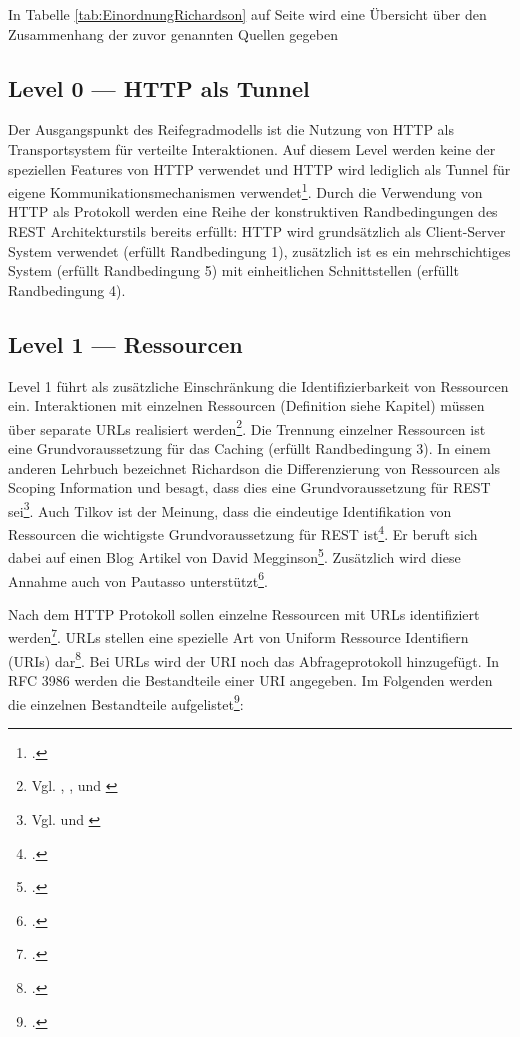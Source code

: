 In Tabelle \ref{tab:EinordnungRichardson} auf Seite \pageref{tab:EinordnungRichardson} wird eine Übersicht über den Zusammenhang der zuvor genannten Quellen gegeben 

\subsection{Level 0 — HTTP als Tunnel}\label{subsection:level-0}

Der Ausgangspunkt des Reifegradmodells ist die Nutzung von HTTP als Transportsystem für verteilte Interaktionen. Auf diesem Level werden keine der speziellen Features von HTTP verwendet und HTTP wird lediglich als Tunnel für eigene Kommunikationsmechanismen verwendet\footcite[Vgl. ]{fowler_richardson_2010}. Durch die Verwendung von HTTP als Protokoll werden eine Reihe der konstruktiven Randbedingungen des REST Architekturstils bereits erfüllt: HTTP wird grundsätzlich als Client-Server System verwendet (erfüllt Randbedingung 1), zusätzlich ist es ein mehrschichtiges System (erfüllt Randbedingung 5) mit einheitlichen Schnittstellen (erfüllt Randbedingung 4).

\subsection{Level 1 — Ressourcen}\label{subsection:level-1}

Level 1 führt als zusätzliche Einschränkung die Identifizierbarkeit von Ressourcen ein. Interaktionen mit einzelnen Ressourcen (Definition siehe Kapitel) müssen über separate URLs realisiert werden\footnote{Vgl. \cite{fowler_richardson_2010}, \cite[S. 81]{richardson_restful_2007}, \cite{berners-lee_univeral_1996} und \cite[S. 22]{pautasso_rest_2009}}. Die Trennung einzelner Ressourcen ist eine Grundvoraussetzung für das Caching (erfüllt Randbedingung 3). In einem anderen Lehrbuch bezeichnet Richardson die Differenzierung von Ressourcen als Scoping Information und besagt, dass dies eine Grundvoraussetzung für REST sei\footnote{Vgl. \cite[S. 79]{richardson_restful_2007} und \cite[S. 105]{richardson_restful_2007}}. Auch Tilkov ist der Meinung, dass die eindeutige Identifikation von Ressourcen die wichtigste Grundvoraussetzung für REST ist\footcite[Vgl. ][S. 40]{tilkov_rest_2015}. Er beruft sich dabei auf einen Blog Artikel von David Megginson\footcite[Vgl. ]{megginson_rest_2007}. Zusätzlich wird diese Annahme auch von Pautasso unterstützt\footcite[Vgl. ][S. 3]{pautasso_restful_2014}.

Nach dem HTTP Protokoll sollen einzelne Ressourcen mit URLs identifiziert werden\footcite[Vgl. ][S. 18]{fielding_hypertext_1999}. URLs stellen eine spezielle Art von Uniform Ressource Identifiern (URIs) dar\footcite[Vgl. ]{berners-lee_uniform_2005-1}. Bei URLs wird der URI noch das Abfrageprotokoll hinzugefügt. In RFC 3986 werden die Bestandteile einer URI angegeben. Im Folgenden werden die einzelnen Bestandteile aufgelistet\footcite[Vgl. ][S. 6ff]{berners-lee_uniform_2005-1}:

